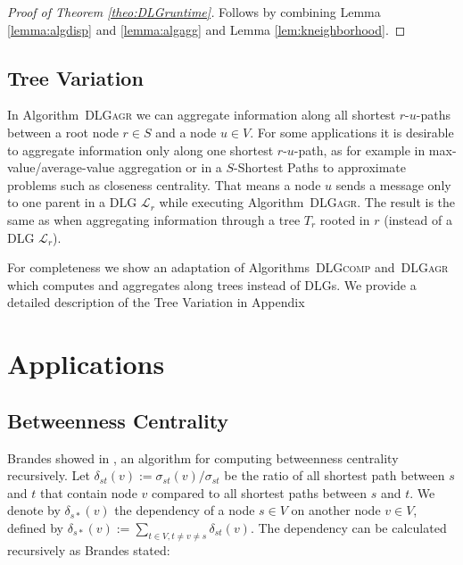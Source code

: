 \documentclass[11pt]{article}
\newcommand{\todoI}[1]{}\newcommand{\blueI}[1]{}
\newcommand{\calL}{\mathcal{L}}
\newif\iffull
\newif\ifshort
\begin{document}
\begin{proof}[Proof of Theorem \ref{theo:DLGruntime}]
Follows by combining Lemma \ref{lemma:algdisp} and \ref{lemma:algagg} and Lemma \ref{lem:kneighborhood}.
\end{proof}



\subsection{Tree Variation}
\label{sec:tree}

In Algorithm\iffull~\ref{alg:DLGagr}\fi~\textsc{DLGagr} we can aggregate information along all shortest $r$-$u$-paths between a root node $r\in S$ and a node $u\in V$.
For some applications it is desirable to aggregate information only along one shortest $r$-$u$-path, as for example in max-value/average-value aggregation or in a  $S$-Shortest Paths to approximate problems such as closeness centrality.
That means a node $u$ sends a message only to one parent in a DLG $\calL_r$ while executing Algorithm\iffull~\ref{alg:DLGagr}\fi~\textsc{DLGagr}.
The result is the same as when aggregating information through a tree $T_r$ rooted in $r$ (instead of a DLG $\calL_r$).
\todoI{Can be done inside aggregation fkt?}
For completeness we show an adaptation of Algorithms\iffull~\ref{alg:DLGcomp}\fi~\textsc{DLGcomp} and\iffull~\ref{alg:DLGagr}\fi~\textsc{DLGagr} which computes and aggregates along trees instead of DLGs.
We provide a detailed description of the Tree Variation in Appendix 
\ifshort
\ref{FULL:app:tree}.
\fi
\iffull
\ref{app:tree}.
\fi







\section{Applications}

\subsection{Betweenness Centrality}
\label{sec:BC}

Brandes showed in \cite{brandes:2001:fasterBCalgo}, an algorithm for computing betweenness centrality recursively. Let $\delta_{st}(v):=\sigma_{st}(v)/\sigma_{st}$ be the ratio of all shortest path between $s$ and $t$ that contain node $v$ compared to all shortest paths between $s$ and $t$. We denote by $\delta_{s*}(v)$ \todoI{how does it relate to BC?}the dependency of a node $s\in V$ on another node $v\in V$, defined by $\delta_{s*}(v):=\sum_{t\in V, t\neq v\neq s}\delta_{st}(v)$. The dependency can be calculated recursively as Brandes  \cite{brandes:2001:fasterBCalgo} stated:
\end{document}
